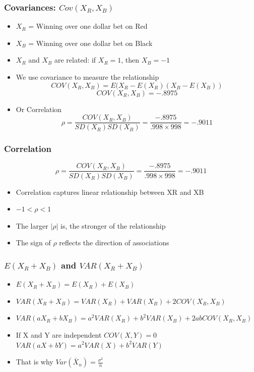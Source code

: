 \documentclass[
  ignorenonframetext,
]{beamer}
\providecommand{\tightlist}{%
  \setlength{\itemsep}{0pt}\setlength{\parskip}{0pt}}
\begin{document}
\begin{frame}
\frametitle{Covariances: $Cov(X_R, X_B)$}

\begin{itemize}
\item
  \(X_R\) = Winning over one dollar bet on Red
\item
  \(X_B\) = Winning over one dollar bet on Black
\item
  \(X_R\) and \(X_B\) are related: if \(X_R=1\), then \(X_B=-1\)
\item
  We use covariance to measure the relationship
  \[COV(X_R, X_B)=E(X_R-E(X_R)( X_B-E(X_B))\] \[COV(X_R, X_B)=-.8975\]
\item
  Or Correlation
  \[\rho = \frac{COV(X_R, X_B)}{SD(X_R) SD(X_B)} = \frac{-.8975}{.998 \times 998} = -.9011\]
\end{itemize}
\end{frame}

\begin{frame}
\frametitle{Correlation}

\[\rho = \frac{COV(X_R, X_B)}{SD(X_R) SD(X_B)} = \frac{-.8975}{.998 \times 998} = -.9011\]

\begin{itemize}
\tightlist
\item
  Correlation captures linear relationship between XR and XB
\item
  \(-1 < \rho < 1\)
\item
  The larger \(|\rho|\) is, the stronger of the relationship
\item
  The sign of \(\rho\) reflects the direction of associations
\end{itemize}
\end{frame}

\begin{frame}
\frametitle{$E(X_R+X_B)$ and $VAR(X_R+X_B)$}

\begin{itemize}
\tightlist
\item
  \(E(X_R+X_B)=E(X_R) + E(X_B)\)
\item
  \(VAR(X_R+X_B)= VAR(X_R)+ VAR(X_B)+2COV(X_R, X_B)\)
\item
  \(VAR(aX_R+bX_B)=a^2 VAR(X_R)+b^2 VAR(X_B) +2ab COV(X_R, X_B)\)
\item
  If X and Y are independent \(COV(X, Y)=0\)
  \(VAR(aX+bY)= a^2 VAR(X)+b^2 VAR(Y)\)
\item
  That is why \(Var(\bar{X}_n) = \frac{\sigma^2}{n}\)
\end{itemize}
\end{frame}
\end{document}
